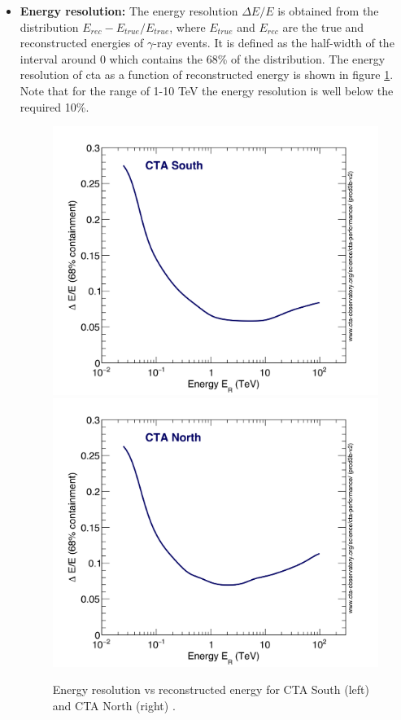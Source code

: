 \documentclass[main.tex]{subfiles}
\begin{document}
\begin{itemize}
\item \textbf{Energy resolution:} The energy resolution $\Delta E/E$ is obtained from the distribution $E_{rec}-E_{true}/E_{true}$, where $E_{true}$ and $E_{rec}$ are the true and reconstructed energies of $\gamma$-ray events. It is defined as the half-width of the interval around 0 which contains the 68\% of the distribution. The energy resolution of \gls{cta} as a function of reconstructed energy is shown in figure \ref{fig:energyres}. Note that for the range of 1-10 TeV the energy resolution is well below the required 10\%.\\
    
  \begin{figure}[!htb]
    \includegraphics[width=\linewidth]{Pictures/CTA-Performance-prod3b-v2-South-20deg-EnergyResolution.pdf}
    \endminipage\hfill
    \includegraphics[width=\linewidth]{Pictures/CTA-Performance-prod3b-v2-North-20deg-EnergyResolution.pdf}
    \endminipage\hfill
    \caption{\label{fig:energyres} Energy resolution vs reconstructed energy for CTA South (left) and CTA North (right) \cite{CTAPerformance}.}
  \end{figure}
  

\end{itemize}
\end{document}

